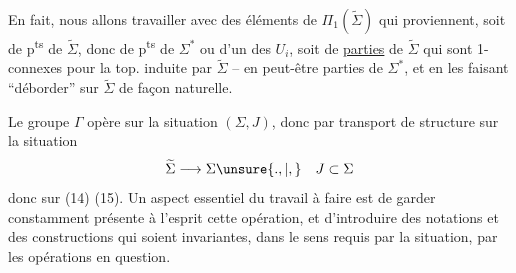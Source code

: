 En fait, nous allons travailler avec des éléments de $\Pi_1(\widetilde\Sigma)$ qui proviennent, soit de p\textsuperscript{ts} de $\widetilde\Sigma$, donc de p\textsuperscript{ts} de $\Sigma^*$ ou d'un des $U_i$, soit de \uline{parties} de $\widetilde\Sigma$ qui sont 1-connexes pour la top. induite par $\widetilde\Sigma$ -- en  peut-être  parties  de $\Sigma^*$, et en les faisant ``déborder'' sur $\widetilde\Sigma$ de façon naturelle.

Le groupe $\Gamma$ opère sur la situation  $(\Sigma,J)$, donc par transport de structure sur la situation
\[
\widetilde\Sigma\longrightarrow\Sigma\unsure{.,|,}\quad J\subset\Sigma
\]
donc sur  (14) (15). Un aspect essentiel du travail à faire est de garder  constamment présente à l'esprit cette opération, et d'introduire des notations et des constructions qui soient invariantes, dans le sens requis par la situation, par les opérations en question.
